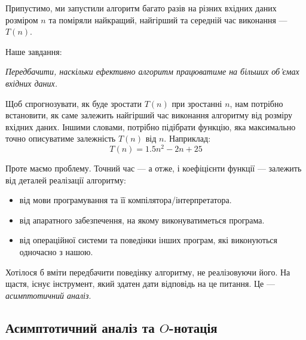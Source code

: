 \documentclass[12pt,a4paper]{report}
\begin{document}
Припустимо, ми запустили алгоритм багато разів на різних вхідних даних розміром \(n\) та поміряли найкращий, найгірший та середній час виконання --- \(T(n)\).


Наше завдання:

{\itshape Передбачити, наскільки ефективно алгоритм працюватиме на більших об’ємах вхідних даних.}

Щоб спрогнозувати, як буде зростати \(T(n)\) при зростанні \(n\), нам потрібно встановити, як саме залежить найгірший час виконання алгоритму від розміру вхідних даних.
Іншими словами, потрібно підібрати функцію, яка максимально точно описуватиме залежність \(T(n)\) від \(n\). Наприклад:
\[T(n) = 1.5n^2 - 2n + 25\]

Проте маємо проблему. Точний час --- а отже, і коефіцієнти функції --- залежить від деталей реалізації алгоритму:
\begin{itemize}
    \item від мови програмування та її компілятора/інтерпретатора.
    \item від апаратного забезпечення, на якому виконуватиметься програма.
    \item від операційної системи та поведінки інших програм, які виконуються одночасно з нашою.
\end{itemize}

Хотілося б вміти передбачити поведінку алгоритму, не реалізовуючи його. На щастя, існує інструмент, який здатен дати відповідь на це питання. Це --- \emph{асимптотичний аналіз}.

\subsection*{Асимптотичний аналіз та \(O\)-нотація}
\end{document}
